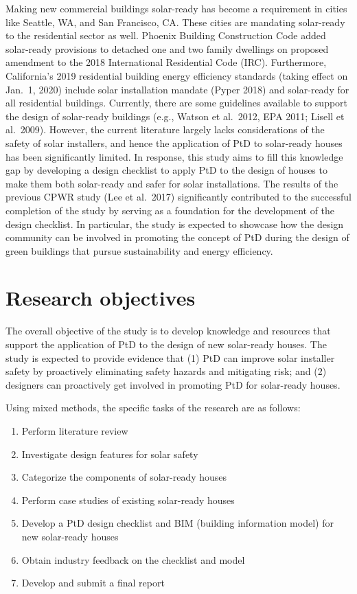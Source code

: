\documentclass[]{article}
\providecommand{\tightlist}{%
  \setlength{\itemsep}{0pt}\setlength{\parskip}{0pt}}
\begin{document}
Making new commercial buildings solar-ready has become a requirement in
cities like Seattle, WA, and San Francisco, CA. These cities are
mandating solar-ready to the residential sector as well. Phoenix
Building Construction Code added solar-ready provisions to detached one
and two family dwellings on proposed amendment to the 2018 International
Residential Code (IRC). Furthermore, California's 2019 residential
building energy efficiency standards (taking effect on Jan.~1, 2020)
include solar installation mandate (Pyper 2018) and solar-ready for all
residential buildings. Currently, there are some guidelines available to
support the design of solar-ready buildings (e.g., Watson et al.~2012,
EPA 2011; Lisell et al.~2009). However, the current literature largely
lacks considerations of the safety of solar installers, and hence the
application of PtD to solar-ready houses has been significantly limited.
In response, this study aims to fill this knowledge gap by developing a
design checklist to apply PtD to the design of houses to make them both
solar-ready and safer for solar installations. The results of the
previous CPWR study (Lee et al.~2017) significantly contributed to the
successful completion of the study by serving as a foundation for the
development of the design checklist. In particular, the study is
expected to showcase how the design community can be involved in
promoting the concept of PtD during the design of green buildings that
pursue sustainability and energy efficiency.

\hypertarget{research-objectives}{%
\section{Research objectives}\label{research-objectives}}

The overall objective of the study is to develop knowledge and resources
that support the application of PtD to the design of new solar-ready
houses. The study is expected to provide evidence that (1) PtD can
improve solar installer safety by proactively eliminating safety hazards
and mitigating risk; and (2) designers can proactively get involved in
promoting PtD for solar-ready houses.

Using mixed methods, the specific tasks of the research are as follows:

\begin{enumerate}
\def\labelenumi{\arabic{enumi}.}
\tightlist
\item
  Perform literature review
\item
  Investigate design features for solar safety
\item
  Categorize the components of solar-ready houses
\item
  Perform case studies of existing solar-ready houses
\item
  Develop a PtD design checklist and BIM (building information model)
  for new solar-ready houses
\item
  Obtain industry feedback on the checklist and model
\item
  Develop and submit a final report
\end{enumerate}
\end{document}
